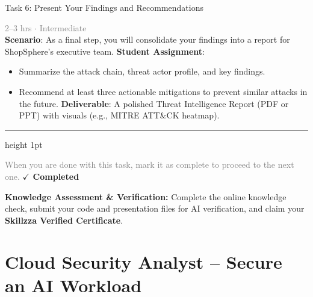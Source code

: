 \documentclass[10pt,a4paper]{article}
\begin{document}
\begin{taskbox}{Task 6: Present Your Findings and Recommendations}

    {\small \textcolor{gray}{2--3 hrs $\cdot$ Intermediate}}\\[12pt]

    \textbf{Scenario}: As a final step, you will consolidate your findings into a report for ShopSphere’s executive team.  
\textbf{Student Assignment}:  
\begin{itemize}
    \item Summarize the attack chain, threat actor profile, and key findings.  
    \item Recommend at least three actionable mitigations to prevent similar attacks in the future.  
\textbf{Deliverable}: A polished Threat Intelligence Report (PDF or PPT) with visuals (e.g., MITRE ATT\&CK heatmap).\par
\end{itemize}

    \vspace{16pt}

    \textcolor{cardBorder}{\hrule height 1pt}\vspace{8pt}

    \small \textcolor{gray}{When you are done with this task, mark it as complete to proceed to the next one.} \hfill \textbf{\textcolor{brandDark}{$\checkmark$ Completed}}

\end{taskbox}

\begin{completionbox}
    \textbf{Knowledge Assessment \& Verification:} Complete the online knowledge check, submit your code and presentation files for AI verification, and claim your \textbf{Skillzza Verified Certificate}.
\end{completionbox}

\newpage




\section*{Cloud Security Analyst – Secure an AI Workload}

\end{document}
